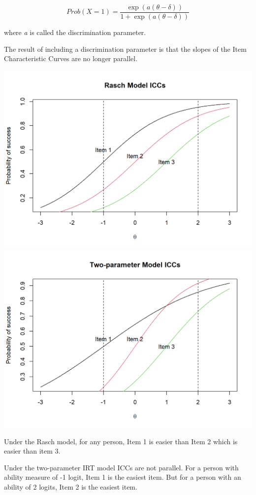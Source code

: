 \documentclass[
  letterpaper,
  DIV=11,
  numbers=noendperiod]{scrreprt}
\begin{document}
\[
Prob(X=1) = \frac{\exp(a(\theta - \delta))}{1+\exp(a(\theta - \delta))}
\]

where \emph{a} is called the discrimination parameter.

The result of including a discrimination parameter is that the slopes of
the Item Characteristic Curves are no longer parallel.

\includegraphics{images/ICC2-1.png} \includegraphics{images/ICC3-1.png}

Under the Rasch model, for any person, Item 1 is easier than Item 2
which is easier than item 3.

Under the two-parameter IRT model ICCs are not parallel. For a person
with ability measure of -1 logit, Item 1 is the easiest item. But for a
person with an ability of 2 logits, Item 2 is the easiest item.
\end{document}
